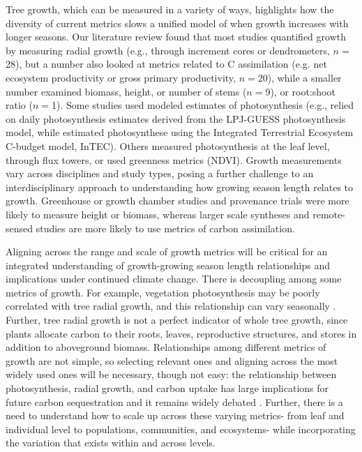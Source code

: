 \documentclass[11pt]{article}
\begin{document}
Tree growth, which can be measured in a variety of ways, highlights how the diversity of current metrics slows a unified model of when growth increases with longer seasons. Our literature review found that most studies quantified growth by measuring radial growth (e.g., through increment cores or dendrometers, $n=$28), but a number also looked at metrics related to C assimilation (e.g. net ecosystem productivity or gross primary productivity, $n=$20), while a smaller number examined biomass, height, or number of stems ($n=$9), or root:shoot ratio ($n=$1). Some studies used modeled estimates of photosynthesis 
(e.g., \citet{smith2014implications} relied on daily photosynthesis estimates derived from the LPJ-GUESS photosynthesis model, while \citet{chen2000approaches} estimated photosynthese using the Integrated Terrestrial Ecosystem C-budget model, InTEC). Others measured photosynthesis at the leaf level, through flux towers, or used greenness metrics (NDVI). Growth measurements vary across disciplines and study types, posing a further challenge to an interdisciplinary approach to understanding how growing season length relates to growth. Greenhouse or growth chamber studies and provenance trials were more likely to measure height or biomass, whereas larger scale syntheses and remote-sensed studies are more likely to use metrics of carbon assimilation. 

Aligning across the range and scale of growth metrics will be critical for an integrated understanding of growth-growing season length relationships and implications under continued climate change.  There is decoupling among some metrics of growth. For example, vegetation photosynthesis may be poorly correlated with tree radial growth, and this relationship can vary seasonally \citep{cabon2022cross}. Further, tree radial growth is not a perfect indicator of whole tree growth, since plants allocate carbon to their roots, leaves, reproductive structures, and stores in addition to aboveground biomass. Relationships among different metrics of growth are not simple, so selecting relevant ones and aligning across the most widely used ones will be necessary, though not easy: the relationship  between photosynthesis, radial growth, and carbon uptake has large implications for future carbon sequestration and it remains widely debated \citep{green2022limits}. Further, there is a need to understand how to scale up across these varying metrics- from leaf and individual level to populations, communities, and ecosystems- while incorporating the variation that exists within and across levels.
\end{document}
